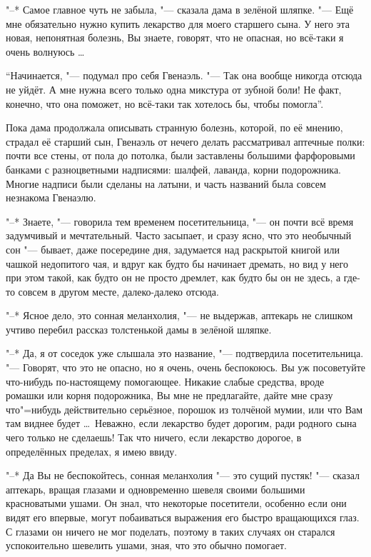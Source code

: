 "--* Самое главное чуть не забыла, "--- сказала дама в зелёной шляпке.
"--- Ещё мне обязательно нужно купить лекарство для моего старшего сына.
У него эта новая, непонятная болезнь, Вы знаете, говорят, что не опасная, но
всё-таки я очень волнуюсь \ldots

\enquote{Начинается, "--- подумал про себя Гвенаэль.
"--- Так она вообще никогда отсюда не уйдёт.
А мне нужна всего только одна микстура от зубной боли!
Не факт, конечно, что она поможет, но всё-таки так хотелось бы, чтобы помогла}.

Пока дама продолжала описывать странную болезнь, которой, по её мнению, страдал
её старший сын, Гвенаэль от нечего делать рассматривал аптечные полки: почти
все стены, от пола до потолка, были заставлены большими фарфоровыми банками с
разноцветными надписями: шалфей, лаванда, корни подорожника.
Многие надписи были сделаны на латыни, и часть названий была совсем незнакома
Гвенаэлю.

"--* Знаете, "--- говорила тем временем посетительница, "--- он почти всё время
задумчивый и мечтательный.
Часто засыпает, и сразу ясно, что это необычный сон "--- бывает, даже
посередине дня, задумается над раскрытой книгой или чашкой недопитого чая, и
вдруг как будто бы начинает дремать, но вид у него при этом такой, как будто он
не просто дремлет, как будто бы он не здесь, а где-то совсем в другом месте,
далеко-далеко отсюда.

"--* Ясное дело, это сонная меланхолия, "--- не выдержав, аптекарь не слишком
учтиво перебил рассказ толстенькой дамы в зелёной шляпке.

"--* Да, я от соседок уже слышала это название, "--- подтвердила
посетительница.
"--- Говорят, что это не опасно, но я очень, очень беспокоюсь.
Вы уж посоветуйте что-нибудь по-настоящему помогающее.
Никакие слабые средства, вроде ромашки или корня подорожника, Вы мне не
предлагайте, дайте мне сразу что"=нибудь действительно серьёзное, порошок из
толчёной мумии, или что Вам там виднее будет \ldots\
Неважно, если лекарство будет дорогим, ради родного сына чего только не
сделаешь!
Так что ничего, если лекарство дорогое, в определённых пределах, я имею ввиду.

"--* Да Вы не беспокойтесь, сонная меланхолия "--- это сущий пустяк! "---
сказал аптекарь, вращая глазами и одновременно шевеля своими большими
красноватыми ушами.
Он знал, что некоторые посетители, особенно если они видят его впервые, могут
побаиваться выражения его быстро вращающихся глаз.
С глазами он ничего не мог поделать, поэтому в таких случаях он старался
успокоительно шевелить ушами, зная, что это обычно помогает.

